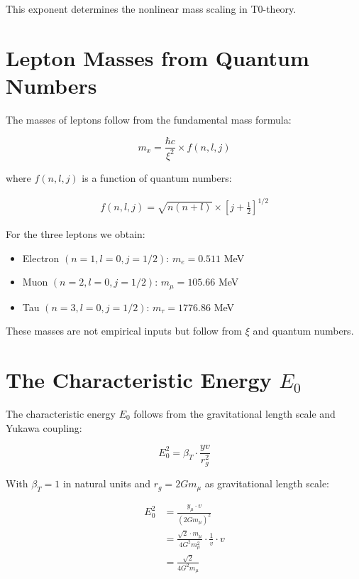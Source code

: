 \documentclass[12pt,a4paper]{article}
\begin{document}
	This exponent determines the nonlinear mass scaling in T0-theory.
	
	\section{Lepton Masses from Quantum Numbers}
	
	The masses of leptons follow from the fundamental mass formula:
	
	\begin{equation}
		m_x = \frac{\hbar c}{\xi^2} \times f(n, l, j)
	\end{equation}
	
	where $f(n, l, j)$ is a function of quantum numbers:
	
	\begin{align}
		f(n, l, j) = \sqrt{n(n+l)} \times \left[j + \frac{1}{2}\right]^{1/2}
	\end{align}
	
	For the three leptons we obtain:
	
	\begin{itemize}
		\item Electron $(n=1, l=0, j=1/2)$: $m_e = 0.511$ MeV
		\item Muon $(n=2, l=0, j=1/2)$: $m_\mu = 105.66$ MeV
		\item Tau $(n=3, l=0, j=1/2)$: $m_\tau = 1776.86$ MeV
	\end{itemize}
	
	These masses are not empirical inputs but follow from $\xi$ and quantum numbers.
	
	\section{The Characteristic Energy $E_0$}
	
	The characteristic energy $E_0$ follows from the gravitational length scale and Yukawa coupling:
	
	\begin{equation}
		E_0^2 = \beta_T \cdot \frac{yv}{r_g^2}
	\end{equation}
	
	With $\beta_T = 1$ in natural units and $r_g = 2Gm_\mu$ as gravitational length scale:
	
	\begin{align}
		E_0^2 &= \frac{y_\mu \cdot v}{(2Gm_\mu)^2}\\
		&= \frac{\sqrt{2} \cdot m_\mu}{4G^2 m_\mu^2} \cdot \frac{1}{v} \cdot v\\
		&= \frac{\sqrt{2}}{4G^2 m_\mu}
	\end{align}
	
\end{document}
